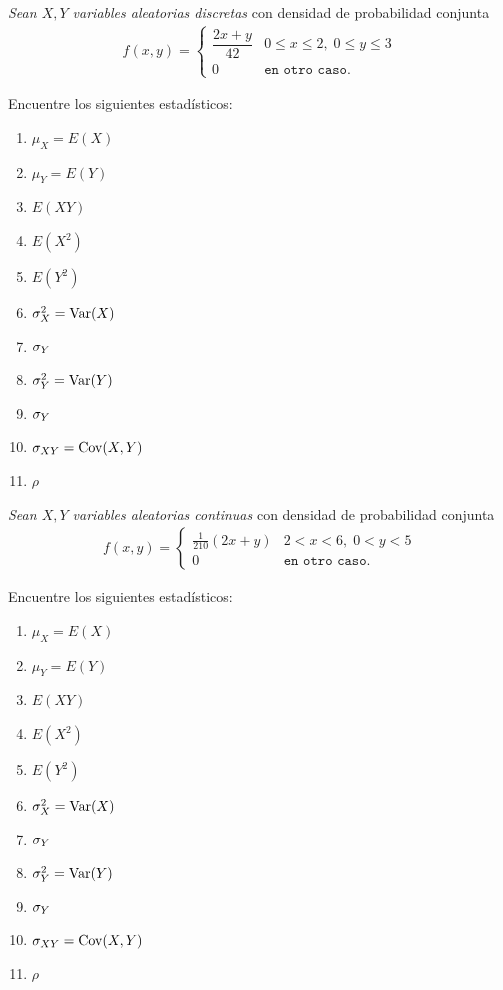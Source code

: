  \begin{ejemplo}
  \label{sol:3.25}
  \emph{Sean $X,Y$ variables aleatorias discretas} con densidad de probabilidad conjunta
  \begin{align}f(x,y)=
   \begin{cases}
    \dfrac{2x+y}{42} & 0\leq x \leq 2,\; 0\leq y \leq 3 \\
    0 & \texttt{en otro caso}.
   \end{cases}
  \end{align}
 \end{ejemplo}
 

Encuentre los siguientes estadísticos:
\begin{multicols}{3}
 \begin{enumerate}
 \item $\mu_X = E(X)$ %
 \item $\mu_Y = E(Y)$ %
 \item $ E(XY)$ %
 \item $E(X^2)$ %
 \item $E(Y^2)$ %
 \item $\sigma^2_X = \operatorname{Var}(X)$ %
 \item $\sigma_{Y}$
 \item $\sigma^2_Y = \operatorname{Var}(Y)$ %
 \item $\sigma_{Y}$
 \item $\sigma_{XY} =\operatorname{Cov}(X,Y)$ %
 \item $\rho$
\end{enumerate}
\end{multicols}






 \begin{ejemplo}
  \label{sol:3.26}
  \emph{Sean $X,Y$ variables aleatorias continuas} con densidad de probabilidad conjunta
  \begin{align}f(x,y)=
   \begin{cases}
    \frac{1}{210}(2x+y) & 2 < x < 6,\; 0<y<5 \\
    0 & \texttt{en otro caso}.
   \end{cases}
  \end{align}
 \end{ejemplo}

 

Encuentre los siguientes estadísticos:
\begin{multicols}{3}
 \begin{enumerate}
 \item $\mu_X = E(X)$ %
 \item $\mu_Y = E(Y)$ %
 \item $ E(XY)$ %
 \item $E(X^2)$ %
 \item $E(Y^2)$ %
 \item $\sigma^2_X = \operatorname{Var}(X)$ %
 \item $\sigma_{Y}$
 \item $\sigma^2_Y = \operatorname{Var}(Y)$ %
 \item $\sigma_{Y}$
 \item $\sigma_{XY} =\operatorname{Cov}(X,Y)$ %
 \item $\rho$
\end{enumerate}
\end{multicols}




